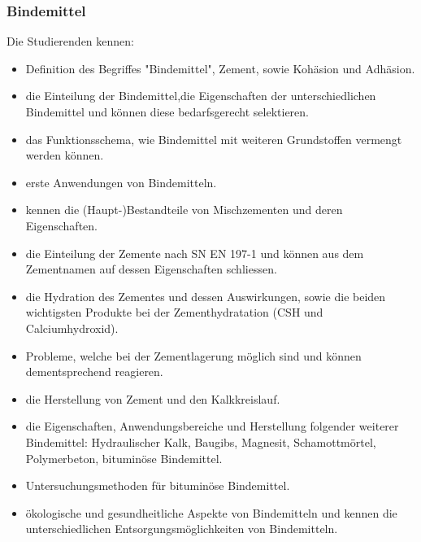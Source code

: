 \subsubsection*{Bindemittel}

Die Studierenden kennen: 

\begin{itemize}[noitemsep]
	\item Definition des Begriffes "Bindemittel", Zement, sowie Kohäsion und Adhäsion.
	\item die Einteilung der Bindemittel,die Eigenschaften der unterschiedlichen Bindemittel und können diese bedarfsgerecht selektieren. 
	\item das Funktionsschema, wie Bindemittel mit weiteren Grundstoffen vermengt werden können.
	\item erste Anwendungen von Bindemitteln.
	\item kennen die (Haupt-)Bestandteile von Mischzementen und deren Eigenschaften.
	\item die Einteilung der Zemente nach SN EN 197-1 und können aus dem Zementnamen auf dessen Eigenschaften schliessen.
	\item die Hydration des Zementes und dessen Auswirkungen, sowie die beiden wichtigsten Produkte bei der Zementhydratation (CSH und Calciumhydroxid).
	\item Probleme, welche bei der Zementlagerung möglich sind und können dementsprechend reagieren.
	\item die Herstellung von Zement und den  Kalkkreislauf.
	\item die Eigenschaften, Anwendungsbereiche und Herstellung folgender weiterer Bindemittel: Hydraulischer Kalk, Baugibs, Magnesit, Schamottmörtel, Polymerbeton, bituminöse Bindemittel.
	\item Untersuchungsmethoden für bituminöse Bindemittel.
	\item ökologische und gesundheitliche Aspekte von Bindemitteln und kennen die unterschiedlichen Entsorgungsmöglichkeiten von Bindemitteln. 
\end{itemize}